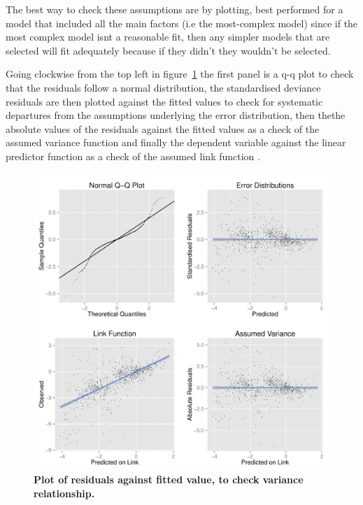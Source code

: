 \documentclass[shortnames,nojss,article]{jss}
\begin{document}
The best way to check these assumptions are by plotting, best
performed for a model that included all the main factors (i.e the most-complex model) since if the most
complex model isnt a reasonable fit, then any simpler models that are selected will fit adequately because if they
didn't they wouldn't be selected. 

Going clockwise from the top left in figure~\ref{glm} the first panel is a q-q plot to check that the residuals
follow a normal distribution, the standardised deviance residuals are then plotted against the fitted values to check for
systematic departures from the assumptions underlying the error distribution, then thethe absolute values of the
residuals against the fitted values as a check of the assumed variance function and finally the dependent variable
against the linear predictor function as a check of the assumed link function \cite{ortiz2004alternative}.


\begin{figure}\begin{center}
\includegraphics{diags-018}
\caption{\bf{Plot of residuals against fitted value, to check variance relationship.}}
\label{glm}
\end{center}\end{figure}




\newpage
 

\end{document}
